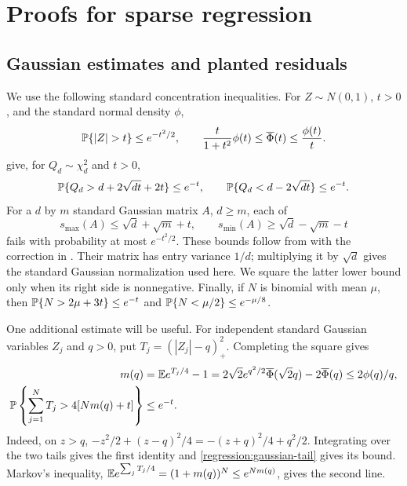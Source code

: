 \section{Proofs for sparse regression}
\label{app:regression}

\subsection{Gaussian estimates and planted residuals}
\label{app:regression:tools}

We use the following standard concentration inequalities. For
$Z\sim N(0,1)$, $t>0$, and the standard normal density $\phi$,
\begin{equation}\label{regression:gaussian-tail}
 \Pbb\{|Z|>t\}\leq e^{-t^2/2},\qquad
 \frac{t}{1+t^2}\phi(t)\leq\overline\Phi(t)\leq\frac{\phi(t)}t.
\end{equation}
\citet[Lemma~1 and (4.3)--(4.4), p.~1325]{laurentMassart2000ChiSquare}
give, for $Q_d\sim\chi_d^2$ and $t>0$,
\begin{equation}\label{regression:chi-tail}
 \mathbb{P}\{Q_d>d+2\sqrt{dt}+2t\}\leq e^{-t},\qquad
 \mathbb{P}\{Q_d<d-2\sqrt{dt}\}\leq e^{-t}.
\end{equation}
For a $d$ by $m$ standard Gaussian matrix $A$, $d\geq m$, each of
\begin{equation}\label{regression:singular-tail}
 s_{\max}(A)\leq\sqrt d+\sqrt m+t,\qquad
 s_{\min}(A)\geq\sqrt d-\sqrt m-t
\end{equation}
fails with probability at most $e^{-t^2/2}$.
These bounds follow from
\citet[Theorem~II.13, p.~353]{davidsonSzarek2001LocalOperatorTheory}
with the correction in
\citet[item~5, p.~1819]{davidsonSzarek2003Corrigendum}.
Their matrix has entry variance $1/d$; multiplying it by $\sqrt d$
gives the standard Gaussian normalization used here.
We square the latter lower bound only when its right side is
nonnegative. Finally, if $N$ is binomial with mean $\mu$, then
$\mathbb{P}\{N>2\mu+3t\}\leq e^{-t}$ and
$\mathbb{P}\{N<\mu/2\}\leq e^{-\mu/8}$.

One additional estimate will be useful. For independent standard
Gaussian variables $Z_j$ and $q>0$, put
$T_j=(|Z_j|-q)_+^2$. Completing the square gives
\begin{align}
 m(q)&=\mathbb{E} e^{T_j/4}-1
       =2\sqrt2e^{q^2/2}\overline\Phi(\sqrt2q)-2\overline\Phi(q)
       \leq 2\phi(q)/q,\\
 \mathbb{P}\left\{\sum_{j=1}^NT_j>4[Nm(q)+t]\right\}&\leq e^{-t}.
 \label{regression:truncated-tail}
\end{align}
Indeed, on $z>q$,
$-z^2/2+(z-q)^2/4=-(z+q)^2/4+q^2/2$.
Integrating over the two tails gives the first identity and
\eqref{regression:gaussian-tail} gives its bound. Markov's inequality,
$\mathbb{E} e^{\sum_jT_j/4}=(1+m(q))^N\leq e^{Nm(q)}$, gives the second line.

